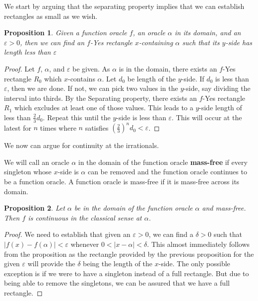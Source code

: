 \documentclass[12pt]{article}
\newtheorem{proposition}{Proposition}
\theoremstyle{remark}
\begin{document}
We start by arguing that the separating property implies that we can establish rectangles as small as we wish. 

\begin{proposition}
Given a function oracle $f$, an oracle $\alpha$ in its domain, and an $\varepsilon > 0$, then we can find an $f$-Yes rectangle $x$-containing $\alpha$ such that its $y$-side has length less than $\varepsilon$
\end{proposition}

\begin{proof}
    Let $f$, $\alpha$, and $\varepsilon$ be given. As $\alpha$ is in the domain, there exists an $f$-Yes rectangle $R_0$ which $x$-contains $\alpha$. Let $d_0$ be length of the $y$-side. If $d_0$ is less than $\varepsilon$, then we are done. If not, we can pick two values in the $y$-side, say dividing the interval into thirds. By the Separating property, there exists an $f$-Yes rectangle $R_1$ which excludes at least one of those values. This leads to a $y$-side length of less than $\frac{2}{3} d_0$. Repeat this until the $y$-side is less than $\varepsilon$. This will occur at the latest for $n$ times where $n$ satisfies $(\frac{2}{3})^n d_0 < \varepsilon$.  
\end{proof}

We now can argue for continuity at the irrationals. 

We will call an oracle $\alpha$ in the domain of the function oracle \textbf{mass-free} if every singleton whose $x$-side is $\alpha$ can be removed and the function oracle continues to be a function oracle. A function oracle is mass-free if it is mass-free across its domain.  

\begin{proposition}
Let $\alpha$ be in the domain of the function oracle $\alpha$ and mass-free. Then $f$ is continuous in the classical sense at $\alpha$.
\end{proposition}

\begin{proof}
    We need to establish that given an $\varepsilon > 0$, we can find a $\delta > 0$ such that $|f(x) - f(\alpha)| < \varepsilon$ whenever $0 < |x - \alpha| < \delta$. This almost immediately follows from the proposition as the rectangle provided by the previous proposition for the given $\varepsilon$ will provide the $\delta$ being the length of the $x$-side. The only possible exception is if we were to have a singleton instead of a full rectangle. But due to being able to remove the singletons, we can be assured that we have a full rectangle. 
\end{proof}
\end{document}
